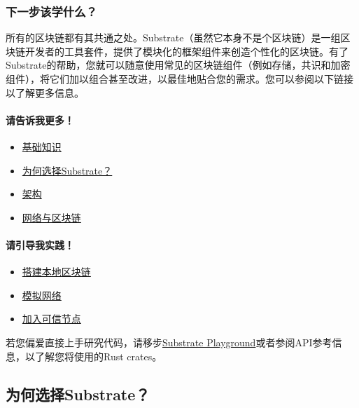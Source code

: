 \hypertarget{ux4e0bux4e00ux6b65ux8be5ux5b66ux4ec0ux4e48}{%
\subsubsection{下一步该学什么？}\label{ux4e0bux4e00ux6b65ux8be5ux5b66ux4ec0ux4e48}}

所有的区块链都有其共通之处。Substrate（虽然它本身不是个区块链）是一组区块链开发者的工具套件，提供了模块化的框架组件来创造个性化的区块链。有了Substrate的帮助，您就可以随意使用常见的区块链组件（例如存储，共识和加密组件），将它们加以组合甚至改进，以最佳地贴合您的需求。您可以参阅以下链接以了解更多信息。

\hypertarget{ux8bf7ux544aux8bc9ux6211ux66f4ux591a}{%
\paragraph{请告诉我更多！}\label{ux8bf7ux544aux8bc9ux6211ux66f4ux591a}}

\begin{itemize}
\item
  \href{/fundamentals/}{基础知识}
\item
  \href{/fundamentals/why-substrate/}{为何选择Substrate？}
\item
  \href{/fundamentals/architecture/}{架构}
\item
  \href{/fundamentals/node-and-network-types/}{网络与区块链}
\end{itemize}

\hypertarget{ux8bf7ux5f15ux5bfcux6211ux5b9eux8df5}{%
\paragraph{请引导我实践！}\label{ux8bf7ux5f15ux5bfcux6211ux5b9eux8df5}}

\begin{itemize}
\item
  \href{/tutorials/get-started/build-local-blockchain/}{搭建本地区块链}
\item
  \href{/tutorials/get-started/simulate-network/}{模拟网络}
\item
  \href{/tutorials/get-started/add-trusted-nodes/}{加入可信节点}
\end{itemize}

若您偏爱直接上手研究代码，请移步\href{https://docs.substrate.io/playground/}{Substrate
Playground}或者参阅API参考信息，以了解您将使用的Rust crates。

\subsection{为何选择Substrate？}

